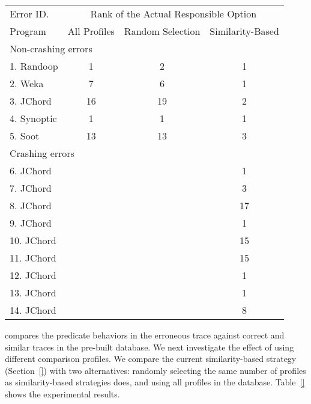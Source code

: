 \begin{table}[t]
\setlength{\tabcolsep}{.24\tabcolsep}
\begin{tabular}{|l|c|c||c|}
\hline
 Error ID. & \multicolumn{3}{|c|}{Rank of the Actual Responsible Option } \\
\cline{2-4}
 Program & All Profiles & Random Selection&  Similarity-Based\\
 \hline
\hline
\multicolumn{4}{|l|}{Non-crashing errors}   \\
 \hline
 1. Randoop & 1 & 2 & 1\\
 2. Weka & 7 & 6 & 1\\
 3. JChord & 16 & 19 & 2\\
 4. Synoptic & 1 & 1 & 1\\
 5. Soot & 13 & 13 & 3\\
\hline
\hline
\multicolumn{4}{|l|}{Crashing errors}   \\
\hline
 6. JChord & & &1\\
 7. JChord & & &3\\
 8. JChord & & &17\\
 9. JChord & & &1\\
 10. JChord & & &15\\
 11. JChord & & &15\\
 12. JChord & & &1\\
 13. JChord & & &1\\
 14. JChord & & &8\\
\hline
\end{tabular}

\end{table}


\ourtool compares the predicate behaviors in the erroneous trace against
correct and similar traces in the pre-built database.
We next investigate the effect of using different comparison
profiles. We compare the current similarity-based strategy (Section~\ref{})
with two alternatives: randomly selecting the same number of
profiles as similarity-based strategies does, and using
all profiles in the database. Table~\ref{} shows the experimental results.

